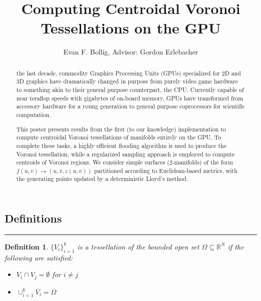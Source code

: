 \documentclass[portrait, boxedsections]{sciposter}
\title{\color{garnet}Computing Centroidal Voronoi Tessellations on the GPU}
\author{Evan F. Bollig, Advisor: Gordon Erlebacher}
\institute{Department of Scientific Computing, Florida State University}
\newtheorem{Def}{Definition}
\begin{document}



\maketitle

\begin{multicols}{3}


\begin{abstract}
 the last decade, commodity Graphics Processing Units (GPUs) specialized for 2D and 3D graphics have dramatically changed in purpose from purely video game hardware to something akin to their general purpose counterpart, the CPU. Currently capable of near teraflop speeds with gigabytes of on-board memory, GPUs have transformed from accessory hardware for a young generation to general purpose coprocessors for scientific computation. \bigskip


This poster presents results from the first (to our knowledge) implementation to compute centroidal Voronoi tessellations of manifolds entirely on the GPU. To complete these tasks, a highly efficient flooding algorithm is used to produce the Voronoi tessellation, while a regularized sampling approach is employed to compute centroids of Voronoi regions. We consider simple surfaces (2-manifolds) of the form $f (u, v) \rightarrow (u, v, z (u, v))$ partitioned according to Euclidean-based metrics, with the generating points updated by a deterministic Lloyd's method. 
\end{abstract}

\section{Definitions}

\hrule
  \begin{Def}
   $\{V_i\}_{i=1}^k$ is a \textcolor{garnet}{tessellation} of the bounded open set $\Omega \subseteq
 \mathbb{R}^N $ if the following are satisfied:
   \begin{itemize}
                \item $V_i \cap V_j = \emptyset$ for $i \neq j$
                \item $\cup_{i=1}^k \overline{V_i} = \overline{\Omega}$
   \end{itemize}
   \end{Def}


\end{multicols}
\end{document}
